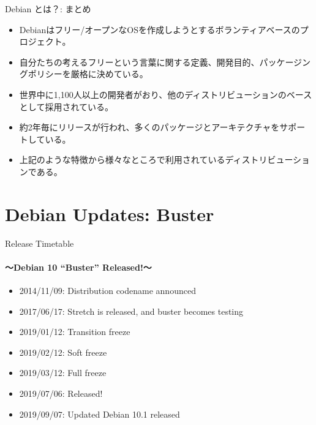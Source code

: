 \documentclass[cjk,c,squeeze,shrink,dvipdfmx,12pt,handout]{beamer}
\begin{document}
\begin{frame}[fragile]{Debian とは？: まとめ}
  \pause
  \begin{itemize}[<+->]
  \item Debianはフリー/オープンなOSを作成しようとするボランティアベースのプロジェクト。
  \item 自分たちの考えるフリーという言葉に関する定義、開発目的、パッケージングポリシーを厳格に決めている。
  \item 世界中に1,100人以上の開発者がおり、他のディストリビューションのベースとして採用されている。
  \item 約2年毎にリリースが行われ、多くのパッケージとアーキテクチャをサポートしている。
  \item 上記のような特徴から様々なところで利用されているディストリビューションである。
\end{itemize}
\end{frame}
\section{Debian Updates: Buster}
{%
  \begin{frame}
    \centering
  \end{frame}
}
\begin{frame}[fragile]{Release Timetable}
  \framesubtitle{〜Debian 10 ``Buster'' Released!〜}
  \pause
  \begin{itemize}[<+->]
  \item 2014/11/09: Distribution codename announced
  \item 2017/06/17: Stretch is released, and buster becomes testing
  \item 2019/01/12: Transition freeze
  \item 2019/02/12: Soft freeze
  \item 2019/03/12: Full freeze
  \item 2019/07/06: Released!
  \item 2019/09/07: Updated Debian 10.1 released
  \end{itemize}
\end{frame}
\end{document}
